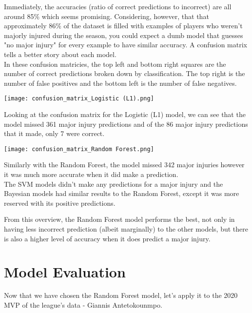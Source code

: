 \documentclass{article}
\begin{document}
Immediately, the accuracies (ratio of correct predictions to incorrect) are all around 85\%
which seems promising. Considering, however, that that approximately 86\% of the  dataset is filled 
with examples of players who weren't majorly injured during the season, you could expect a dumb model that  
guesses "no major injury" for every example to have similar accuracy. A confusion matrix
tells a better story about each model.\\

In these confusion matricies, the top left and bottom right squares are the number of correct predictions
broken down by classification. The top right is the number of false positives and the  
bottom left is the number of false negatives.\\

\begin{center}
    \texttt{[image: confusion\_matrix\_Logistic (L1).png]}
\end{center}

Looking at the confusion matrix for the Logistic (L1) model, we can see 
that the model missed 361 major injury predictions and of the 86
major injury predictions that it made, only 7 were correct.

\begin{center}
    \texttt{[image: confusion\_matrix\_Random Forest.png]}
\end{center}

Similarly with the Random Forest, the model missed 342 major injuries
however it was much more accurate when it did make a prediction.\\

The SVM models didn't make any predictions for a major injury and
the Bayesian models had similar results to the Random Forest, except 
it was more reserved with its positive predictions.

From this overview, the Random Forest model performs the best, not only in having
less incorrect prediction (albeit marginally) to the other models, but 
there is also a higher level of accuracy when it does predict a major injury.

\section*{Model Evaluation}

Now that we have chosen the Random Forest model, let's apply it to the 2020 MVP of the league's data -  Giannis Antetokounmpo.\\
\end{document}
